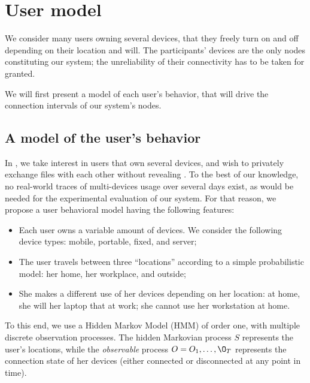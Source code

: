 \section{User model} 
\label{sec:user_model}

We consider many users owning several devices, that they freely turn on and off depending on their location and will.
The participants' devices are the only nodes constituting our system; the unreliability of their connectivity has to be taken for granted.

We will first present a model of each user's behavior, that will drive the connection intervals of our system's nodes.

\subsection{A model of the user's behavior}
\label{sub:a_model_of_the_user_s_behavior}

In \name, we take interest in users that own several devices, and wish to privately exchange files with each other without revealing .
To the best of our knowledge, no real-world traces of multi-devices usage over several days exist, as would be needed for the experimental evaluation of our system.
For that reason, we propose a user behavioral model having the following features:

\begin{itemize}
	\item Each user owns a variable amount of devices. We consider the following device types: mobile, portable, fixed, and server;
	\item The user travels between three ``locations'' according to a simple probabilistic model: her home, her workplace, and outside;
	\item She makes a different use of her devices depending on her location: at home, she will her laptop that at work; she cannot use her workstation at home.
\end{itemize}

To this end, we use a Hidden Markov Model (HMM) of order one, with multiple discrete observation processes. 
The hidden Markovian process $S$ represents the user's locations, while the \emph{observable} process $O=O_1, \dots, \O_T$ represents the connection state of her devices (either connected or disconnected at any point in time).

